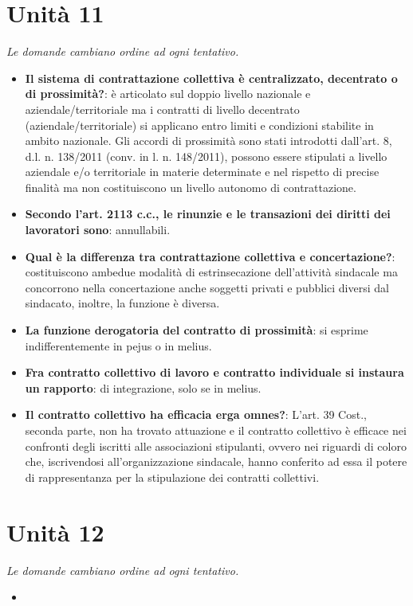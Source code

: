 \documentclass[12pt, a4paper]{report}
\begin{document}
\chapter{Unità 11}
    \textit{Le domande cambiano ordine ad ogni tentativo.}
    \begin{itemize}
        \item \textbf{Il sistema di contrattazione collettiva è centralizzato, decentrato o di prossimità?}: è articolato sul doppio livello nazionale e aziendale/territoriale ma i contratti di livello decentrato (aziendale/territoriale) si applicano entro limiti e condizioni stabilite in ambito nazionale. Gli accordi di prossimità sono stati introdotti dall’art. 8, d.l. n. 138/2011 (conv. in l. n. 148/2011), possono essere stipulati a livello aziendale e/o territoriale in materie determinate e nel rispetto di precise finalità ma non costituiscono un livello autonomo di contrattazione.
        \item \textbf{Secondo l’art. 2113 c.c., le rinunzie e le transazioni dei diritti dei lavoratori sono}: annullabili.
        \item \textbf{Qual è la differenza tra contrattazione collettiva e concertazione?}: costituiscono ambedue modalità di estrinsecazione dell’attività sindacale ma concorrono nella concertazione anche soggetti privati e pubblici diversi dal sindacato, inoltre, la funzione è diversa.
        \item \textbf{La funzione derogatoria del contratto di prossimità}: si esprime indifferentemente in pejus o in melius.
        \item \textbf{Fra contratto collettivo di lavoro e contratto individuale si instaura un rapporto}: di integrazione, solo se in melius.
        \item \textbf{Il contratto collettivo ha efficacia erga omnes?}: L’art. 39 Cost., seconda parte, non ha trovato attuazione e il contratto collettivo è efficace nei confronti degli iscritti alle associazioni stipulanti, ovvero nei riguardi di coloro che, iscrivendosi all’organizzazione sindacale, hanno conferito ad essa il potere di rappresentanza per la stipulazione dei contratti collettivi.
    \end{itemize}
\chapter{Unità 12}
    \textit{Le domande cambiano ordine ad ogni tentativo.}
    \begin{itemize}
        \item 
    \end{itemize}
\end{document}

